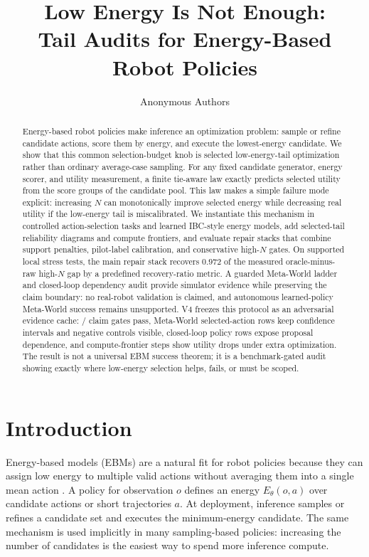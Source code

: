 \documentclass{article}
\title{Low Energy Is Not Enough:\\Tail Audits for Energy-Based Robot Policies}
\author{Anonymous Authors}
\newcommand{\energy}{E_\theta}
\begin{document}
\maketitle

\begin{abstract}
Energy-based robot policies make inference an optimization problem: sample or refine candidate actions, score them by energy, and execute the lowest-energy candidate. We show that this common selection-budget knob is selected low-energy-tail optimization rather than ordinary average-case sampling. For any fixed candidate generator, energy scorer, and utility measurement, a finite tie-aware law exactly predicts selected utility from the score groups of the candidate pool. This law makes a simple failure mode explicit: increasing \(N\) can monotonically improve selected energy while decreasing real utility if the low-energy tail is miscalibrated. We instantiate this mechanism in controlled action-selection tasks and learned IBC-style energy models, add selected-tail reliability diagrams and compute frontiers, and evaluate repair stacks that combine support penalties, pilot-label calibration, and conservative high-\(N\) gates. On supported local stress tests, the main repair stack recovers \(0.972\) of the measured oracle-minus-raw high-\(N\) gap by a predefined recovery-ratio metric. A guarded Meta-World ladder and closed-loop dependency audit provide simulator evidence while preserving the claim boundary: no real-robot validation is claimed, and autonomous learned-policy Meta-World success remains unsupported.
V4 freezes this protocol as an adversarial evidence cache: \VFourEBMClaimGatesPassed{}/\VFourEBMClaimGatesTotal{} claim gates pass, \VFourEBMBenchmarkClaimRows{} Meta-World selected-action rows keep confidence intervals and negative controls visible, \VFourEBMDependencyStressRows{} closed-loop policy rows expose proposal dependence, and \VFourEBMComputeDropSteps{} compute-frontier steps show utility drops under extra optimization. The result is not a universal EBM success theorem; it is a benchmark-gated audit showing exactly where low-energy selection helps, fails, or must be scoped.
\end{abstract}

\section{Introduction}

Energy-based models (EBMs) are a natural fit for robot policies because they can assign low energy to multiple valid actions without averaging them into a single mean action \citep{lecun2006tutorial,florence2022implicit}. A policy for observation \(o\) defines an energy \(\energy(o,a)\) over candidate actions or short trajectories \(a\). At deployment, inference samples or refines a candidate set and executes the minimum-energy candidate. The same mechanism is used implicitly in many sampling-based policies: increasing the number of candidates is the easiest way to spend more inference compute.
\end{document}
